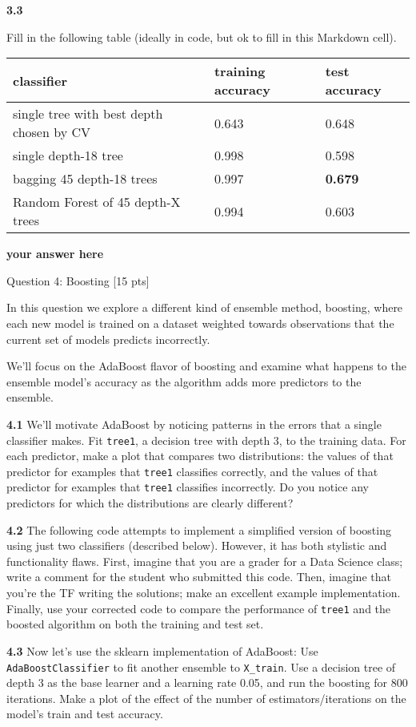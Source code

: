 \documentclass[11pt]{article}
\begin{document}
    \textbf{3.3}

    Fill in the following table (ideally in code, but ok to fill in this
Markdown cell).

\begin{longtable}[]{@{}lll@{}}
\toprule
classifier & training accuracy & test accuracy\tabularnewline
\midrule
\endhead
single tree with best depth chosen by CV & 0.643 & 0.648\tabularnewline
single depth-18 tree & 0.998 & 0.598\tabularnewline
bagging 45 depth-18 trees & 0.997 & \textbf{0.679}\tabularnewline
Random Forest of 45 depth-X trees & 0.994 & 0.603\tabularnewline
\bottomrule
\end{longtable}

    \textbf{your answer here}

     Question 4: Boosting {[}15 pts{]}

In this question we explore a different kind of ensemble method,
boosting, where each new model is trained on a dataset weighted towards
observations that the current set of models predicts incorrectly.

We'll focus on the AdaBoost flavor of boosting and examine what happens
to the ensemble model's accuracy as the algorithm adds more predictors
to the ensemble.

    \textbf{4.1} We'll motivate AdaBoost by noticing patterns in the errors
that a single classifier makes. Fit \texttt{tree1}, a decision tree with
depth 3, to the training data. For each predictor, make a plot that
compares two distributions: the values of that predictor for examples
that \texttt{tree1} classifies correctly, and the values of that
predictor for examples that \texttt{tree1} classifies incorrectly. Do
you notice any predictors for which the distributions are clearly
different?

\textbf{4.2} The following code attempts to implement a simplified
version of boosting using just two classifiers (described below).
However, it has both stylistic and functionality flaws. First, imagine
that you are a grader for a Data Science class; write a comment for the
student who submitted this code. Then, imagine that you're the TF
writing the solutions; make an excellent example implementation.
Finally, use your corrected code to compare the performance of
\texttt{tree1} and the boosted algorithm on both the training and test
set.

\textbf{4.3} Now let's use the sklearn implementation of AdaBoost: Use
\texttt{AdaBoostClassifier} to fit another ensemble to
\texttt{X\_train}. Use a decision tree of depth 3 as the base learner
and a learning rate 0.05, and run the boosting for 800 iterations. Make
a plot of the effect of the number of estimators/iterations on the
model's train and test accuracy.
\end{document}
